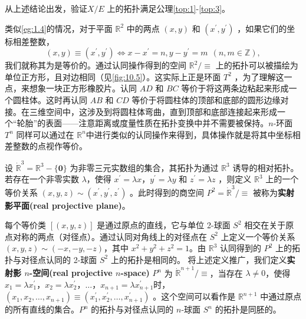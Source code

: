 \begin{exercise}
	从上述结论出发，验证$X/E$ 上的拓扑满足公理\ref{top:1}-\ref{top:3}。
\end{exercise}

\begin{eg}\label{eg:10.14}
	类似\ref{eg:1.4}的情况，对于平面 $\mathbb{R}^{2}$ 中的两点 $(x,y)$ 和 $(x^{\prime},y^{\prime})$ ，如果它们的坐标相差整数，
\begin{equation*}
(x,y)\equiv (x^{\prime},y^{\prime})\Longleftrightarrow x-x^{\prime}=n,y-y^{\prime}=m\ \ (n,m\in \mathbb{Z} ),
\end{equation*}
我们就称其为是等价的。通过认同操作得到的空间 $\mathbb{R}^{2} /\equiv $ 上的拓扑可以被描绘为单位正方形，且对边相同（见\ref{fig:10.5}）。这实际上正是环面 $T^{2}$ ，为了理解这一点，来想象一块正方形橡胶片。认同 $AD$ 和 $BC$ 等价于将这两条边粘起来形成一个圆柱体。这时再认同 $AB$ 和 $CD$ 等价于将圆柱体的顶部和底部的圆形边缘对接。在三维空间中，这涉及到将圆柱体弯曲，直到顶部和底部连接起来形成一个“轮胎”的表面——注意距离或度量性质在拓扑变换中并不需要被保持。$n$-环面 $T^{n}$ 同样可以通过在 $\mathbb{R}^{n}$中进行类似的认同操作来得到，具体操作就是将其中坐标相差整数的点视作等价。
\end{eg}

\begin{eg}\label{eg:10.15}
	设 $\dot{\mathbb{R}}^{3} =\mathbb{R}^{3} -\{\mathbf{0} \}$ 为非零三元实数组的集合，其拓扑为通过 $\mathbb{R}^{3}$ 诱导的相对拓扑。若存在一个非零实数 $\lambda $，使得 $x^{\prime}=\lambda x$，$y^{\prime}=\lambda y$ 和 $z^{\prime}=\lambda z$ ，则定义 $\mathbb{R}^{3}$ 上的一个等价关系 $(x,y,z)\sim (x^{\prime},y^{\prime},z^{\prime})$ 。此时得到的商空间 $P^{2} =\dot{\mathbb{R}}^{3} /\equiv $ 被称为\textbf{实射影平面(real projective plane)}。
\end{eg}
	每个等价类 $[(x,y,z)]$ 是通过原点的直线，它与单位 2-球面 $S^{2}$ 相交在关于原点对称的两点（对径点）。通过认同对角线上的对径点在 $S^{2}$ 上定义一个等价关系$(x,y,z)\sim (-x,-y,-z)$，其中 $x^{2} +y^{2} +z^{2} =1$。由 $\mathbb{R}^{3}$ 认同得到的 $P^{2}$ 上的拓扑与对径点认同的 2-球面 $S^{2}$ 上的拓扑是相同的。
	将上述定义推广，我们定义\textbf{实射影 $n$-空间(real projective $n$-space)} $P^{n}$ 为 $\dot{\mathbb{R}}^{n+1} /\equiv $，当存在 $\lambda \neq 0$，使得 $x_{1} =\lambda x_{1} ^{\prime}$，$x_{2} =\lambda x_{2} ^{\prime}$，$\dotsc $，$x_{n+1} =\lambda x_{n+1} ^{\prime}$时，$(x_{1} ,x_{2} ,\dotsc ,x_{n+1} )\equiv (x_{1} ^{\prime},x_{2} ^{\prime},\dotsc ,x_{n+1} ^{\prime})$ 。这个空间可以看作是 $\mathbb{R}^{n+1}$ 中通过原点的所有直线的集合。$P^{n}$ 的拓扑与对径点认同的 $n$-球面 $S^{n}$ 的拓扑是同胚的。

